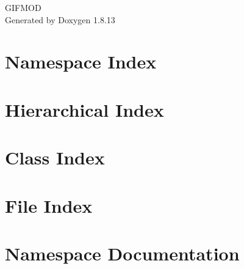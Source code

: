 \documentclass[twoside]{book}
\newcommand{\+}{\discretionary{\mbox{\scriptsize$\hookleftarrow$}}{}{}}
\newcommand{\clearemptydoublepage}{%
  \newpage{\pagestyle{empty}\cleardoublepage}%
}
\begin{document}
\hypersetup{pageanchor=false,
             bookmarksnumbered=true,
             pdfencoding=unicode
            }
\begin{titlepage}
\vspace*{7cm}
\begin{center}%
{\Large G\+I\+F\+M\+OD }\\
\vspace*{1cm}
{\large Generated by Doxygen 1.8.13}\\
\end{center}
\end{titlepage}
\clearemptydoublepage
{}
\tableofcontents
\clearemptydoublepage
{}
\hypersetup{pageanchor=true}

\chapter{Namespace Index}

\chapter{Hierarchical Index}

\chapter{Class Index}

\chapter{File Index}

\chapter{Namespace Documentation}

\end{document}
